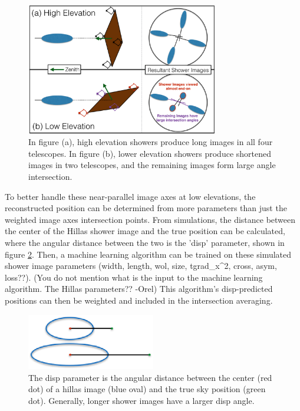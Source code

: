     \begin{figure}[ht]
      \begin{center}
        \includegraphics[width=0.75\textwidth]{images/high_elevation_vs_low_shower_images_cropped.eps}
        \caption[Shower Images at High and Low Elevations]{In figure (a), high elevation showers produce long images in all four telescopes.  In figure (b), lower elevation showers produce shortened images in two telescopes, and the remaining images form large angle intersection.}\label{fig:showerhighlowelev}
      \end{center}
    \end{figure}


    To better handle these near-parallel image axes at low elevations, the reconstructed position can be determined from more parameters than just the weighted image axes intersection points.
    From simulations, the distance between the center of the Hillas shower image and the true position can be calculated, where the angular distance between the two is the 'disp' parameter\cite{Senturk:2011}, shown in figure \ref{fig:dispdiagram}.
    Then, a machine learning algorithm \cite{Beilicke2012NIM} can be trained on these simulated shower image parameters (width, length, wol, size, tgrad_x^2, cross, asym, loss??). %
    (You do not mention what is the input to the machine learning algorithm. The Hillas parameters?? -Orel)
    This algorithm's disp-predicted positions can then be weighted and included in the intersection averaging.

    \begin{figure}[ht]
      \begin{center}
        \includegraphics[width=0.5\textwidth]{images/disp_parameter_cropped.eps}
        \caption[Angular Reconstruction Disp]{The disp parameter is the angular distance between the center (red dot) of a hillas image (blue oval) and the true sky position (green dot).  Generally, longer shower images have a larger disp angle.}\label{fig:dispdiagram}
      \end{center}
    \end{figure}

